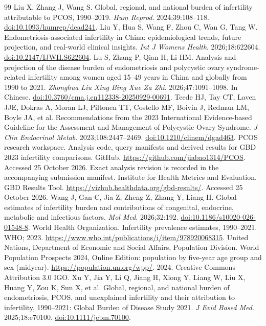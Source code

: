 \documentclass[11pt,a4paper]{article}
\begin{document}
{\begin{thebibliography}{99}
 Liu X, Zhang J, Wang S. Global, regional, and national burden of infertility attributable to PCOS, 1990--2019. \emph{Hum Reprod}. 2024;39:108--118. \href{https://doi.org/10.1093/humrep/dead241}{doi:10.1093/humrep/dead241}.
 Liu Y, Hua S, Wang F, Zhou C, Wan G, Tang W. Endometriosis-associated infertility in China: epidemiological trends, future projection, and real-world clinical insights. \emph{Int J Womens Health}. 2026;18:622604. \href{https://doi.org/10.2147/IJWH.S622604}{doi:10.2147/IJWH.S622604}.
 Lu S, Zhang P, Qian H, Li HM. Analysis and projection of the disease burden of endometriosis and polycystic ovary syndrome-related infertility among women aged 15--49 years in China and globally from 1990 to 2021. \emph{Zhonghua Liu Xing Bing Xue Za Zhi}. 2026;47:1091--1098. In Chinese. \href{https://doi.org/10.3760/cma.j.cn112338-20250929-00691}{doi:10.3760/cma.j.cn112338-20250929-00691}.
Teede HJ, Tay CT, Laven JJE, Dokras A, Moran LJ, Piltonen TT, Costello MF, Boivin J, Redman LM, Boyle JA, et al. Recommendations from the 2023 International Evidence-based Guideline for the Assessment and Management of Polycystic Ovary Syndrome. \emph{J Clin Endocrinol Metab}. 2023;108:2447--2469. \href{https://doi.org/10.1210/clinem/dgad463}{doi:10.1210/clinem/dgad463}.
 PCOS research workspace. Analysis code, query manifests and derived results for GBD 2023 infertility comparisons. GitHub. \url{https://github.com/jiabao1314/PCOS}. Accessed 25 October 2026. Exact analysis revision is recorded in the accompanying submission manifest.
 Institute for Health Metrics and Evaluation. GBD Results Tool. \url{https://vizhub.healthdata.org/gbd-results/}. Accessed 25 October 2026.
Wang J, Gan C, Jia Z, Zheng Z, Zhang Y, Liang H. Global estimates of infertility burden and contributions of congenital, endocrine, metabolic and infectious factors. \emph{Mol Med}. 2026;32:192. \href{https://doi.org/10.1186/s10020-026-01548-8}{doi:10.1186/s10020-026-01548-8}.
 World Health Organization. Infertility prevalence estimates, 1990--2021. WHO; 2023. \url{https://www.who.int/publications/i/item/978920068315}.
 United Nations, Department of Economic and Social Affairs, Population Division. World Population Prospects 2024, Online Edition: population by five-year age group and sex (midyear). \url{https://population.un.org/wpp/}. 2024. Creative Commons Attribution 3.0 IGO.
Xu Y, Jia Y, Li Q, Jiang H, Xiong Y, Liang W, Liu X, Huang Y, Zou K, Sun X, et al. Global, regional, and national burden of endometriosis, PCOS, and unexplained infertility and their attribution to infertility, 1990--2021: Global Burden of Disease Study 2021. \emph{J Evid Based Med}. 2025;18:e70100. \href{https://doi.org/10.1111/jebm.70100}{doi:10.1111/jebm.70100}.
\end{thebibliography}
}
\end{document}
